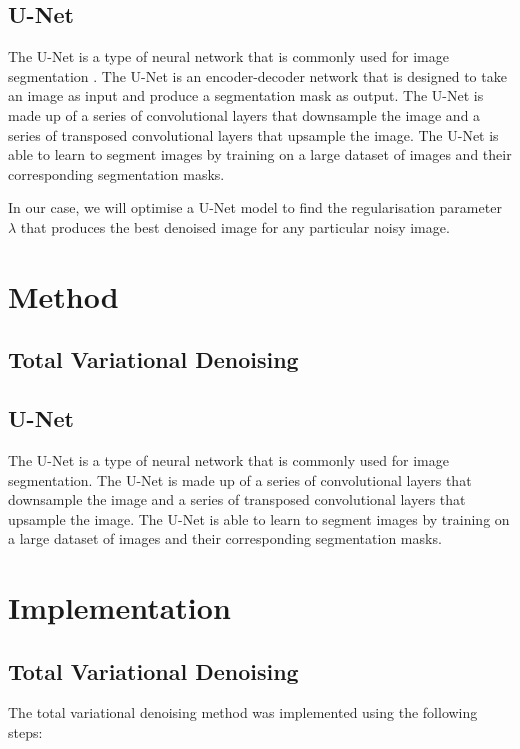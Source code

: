 \documentclass[12pt]{article}
\begin{document}
\subsection{U-Net}

The U-Net is a type of neural network that is commonly used for image segmentation \cite{ronneberger2015unet}.
The U-Net is an encoder-decoder network that is designed to take an image as input and produce a segmentation mask as output.
The U-Net is made up of a series of convolutional layers that downsample the image and a series of transposed convolutional layers that upsample the image.
The U-Net is able to learn to segment images by training on a large dataset of images and their corresponding segmentation masks.

In our case, we will optimise a U-Net model to find the regularisation parameter $\lambda$ that produces the best denoised image for any particular noisy image.

\section{Method}

\subsection{Total Variational Denoising}



\subsection{U-Net}

The U-Net is a type of neural network that is commonly used for image segmentation.
The U-Net is made up of a series of convolutional layers that downsample the image and a series of transposed convolutional layers that upsample the image.
The U-Net is able to learn to segment images by training on a large dataset of images and their corresponding segmentation masks.

\section{Implementation}

\subsection{Total Variational Denoising}

The total variational denoising method was implemented using the following steps:
\end{document}
